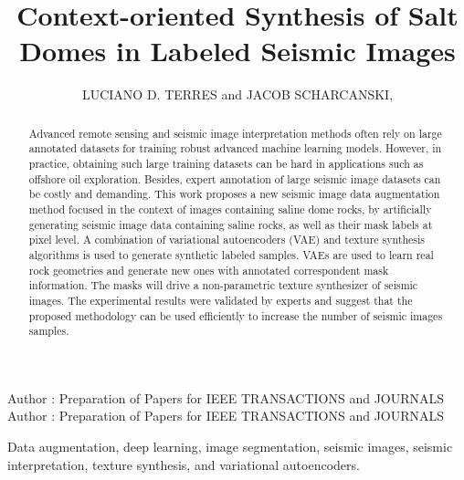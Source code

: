 \documentclass{ieeeaccess}
\begin{document}

\title{Context-oriented Synthesis of Salt Domes in Labeled Seismic Images}
\author{\uppercase{Luciano D. Terres} and
\uppercase{Jacob Scharcanski},  }

\address[1]{Institute of Informatics,
Federal University of Rio Grande do Sul, Porto Alegre, RS, Brasil, 91501-970, e-mail: ldterres@inf.ufrgs.br}
\address[2]{Institute of Informatics, 
Federal University of Rio Grande do Sul, Porto Alegre, RS, Brasil, 91501-970, e-mail: jacobs@inf.ufrgs.br}

\markboth
{Author \headeretal: Preparation of Papers for IEEE TRANSACTIONS and JOURNALS}
{Author \headeretal: Preparation of Papers for IEEE TRANSACTIONS and JOURNALS}



\begin{abstract}
Advanced remote sensing and seismic image interpretation methods often rely on large annotated datasets for training robust advanced machine learning models. However, in practice, obtaining such large training datasets can be hard in applications such as offshore oil exploration. Besides, expert annotation of large seismic image datasets can be costly and demanding. This work proposes a new seismic image data augmentation method focused in the context of images containing saline dome rocks, by artificially generating seismic image data containing saline rocks, as well as their mask labels at pixel level. A combination of variational autoencoders (VAE) and texture synthesis algorithms is used to generate synthetic labeled samples. VAEs are used to learn real rock geometries and generate new ones with annotated correspondent mask information. The masks will drive a non-parametric texture synthesizer of seismic images. The experimental results were validated by experts and suggest that the proposed methodology can be used efficiently to increase the number of seismic images samples. 
\end{abstract}

\begin{keywords}
Data augmentation, deep learning, image segmentation, seismic images, seismic interpretation, texture synthesis, and variational autoencoders.
\end{keywords}
\end{document}
